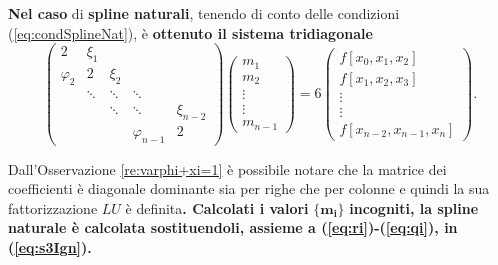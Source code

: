 \textbf{Nel caso} di \textbf{spline naturali}, tenendo di conto delle condizioni (\ref{eq:condSplineNat}), è \textbf{ottenuto il sistema tridiagonale} 
\begin{equation*}
    \begin{pmatrix}
        2 & \xi_1 & && \\
        \varphi_2 & 2 & \xi_2&&\\
        &\ddots & \ddots &\ddots&\\
        &&\ddots & \ddots &\xi_{n-2}\\
        &&&\varphi_{n-1} & 2
    \end{pmatrix}\begin{pmatrix}
        m_1\\
        m_2\\
        \vdots\\
        \vdots\\
        m_{n-1}
    \end{pmatrix}=6\begin{pmatrix}
        f[x_0,x_1,x_2]\\
        f[x_1,x_2,x_3]\\
        \vdots\\
        \vdots\\
        f[x_{n-2},x_{n-1},x_n]
    \end{pmatrix}.
\end{equation*}

Dall'Osservazione \ref{re:varphi+xi=1} è possibile notare che la matrice dei coefficienti è diagonale dominante sia per righe che per colonne e quindi la sua fattorizzazione $LU$ è definita\textbf{. Calcolati i valori} $\boldsymbol{\{m_i\}}$ \textbf{incogniti, la spline naturale è calcolata sostituendoli, assieme a (\ref{eq:ri})-(\ref{eq:qi}), in (\ref{eq:s3Ign}).}

